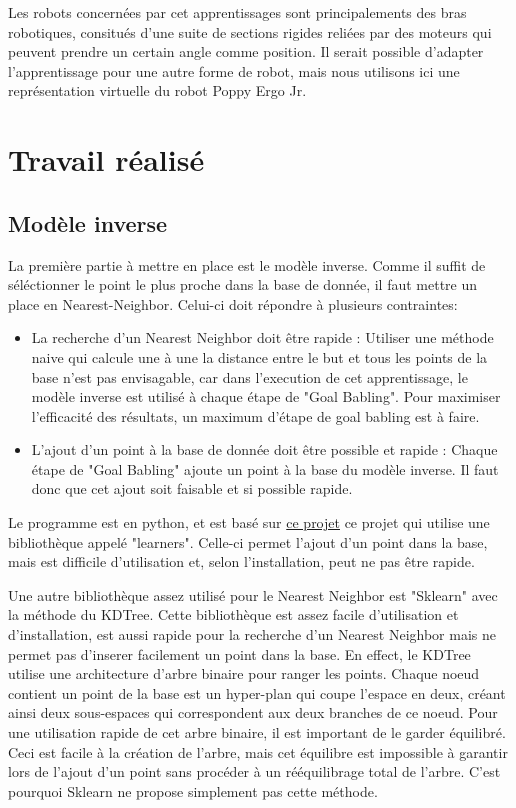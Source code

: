 \documentclass[11pt,french]{article}
\begin{document}
Les robots concernées par cet apprentissages sont principalements des bras robotiques, consitués d'une suite de sections rigides reliées par des moteurs qui peuvent prendre un certain angle comme position. Il serait possible d'adapter l'apprentissage pour une autre forme de robot, mais nous utilisons ici une représentation virtuelle du robot Poppy Ergo Jr.

\section{Travail réalisé}
\subsection{Modèle inverse}

La première partie à mettre en place est le modèle inverse. Comme il suffit de séléctionner le point le plus proche dans la base de donnée, il faut mettre un place en Nearest-Neighbor. Celui-ci doit répondre à plusieurs contraintes:
\begin{itemize}
    \item La recherche d'un Nearest Neighbor doit être rapide : Utiliser une méthode naive qui calcule une à une la distance entre le but et tous les points de la base n'est pas envisagable, car dans l'execution de cet apprentissage, le modèle inverse est utilisé à chaque étape de "Goal Babling". Pour maximiser l'efficacité des résultats, un maximum d'étape de goal babling est à faire.
    \item L'ajout d'un point à la base de donnée doit être possible et rapide : Chaque étape de "Goal Babling" ajoute un point à la base du modèle inverse. Il faut donc que cet ajout soit faisable et si possible rapide.
\end{itemize}

Le programme est en python, et est basé sur \href{http://www.fabien.benureau.com/recode/benureau2015_gb/benureau2015_gb.html}{ce projet} ce projet qui utilise une bibliothèque appelé "learners". Celle-ci permet l'ajout d'un point dans la base, mais est difficile d'utilisation et, selon l'installation, peut ne pas être rapide.

Une autre bibliothèque assez utilisé pour le Nearest Neighbor est "Sklearn" avec la méthode du KDTree. Cette bibliothèque est assez facile d'utilisation et d'installation, est aussi rapide pour la recherche d'un Nearest Neighbor mais ne permet pas d'inserer facilement un point dans la base. En effect, le KDTree utilise une architecture d'arbre binaire pour ranger les points. Chaque noeud contient un point de la base est un hyper-plan qui coupe l'espace en deux, créant ainsi deux sous-espaces qui correspondent aux deux branches de ce noeud. Pour une utilisation rapide de cet arbre binaire, il est important de le garder équilibré. Ceci est facile à la création de l'arbre, mais cet équilibre est impossible à garantir lors de l'ajout d'un point sans procéder à un rééquilibrage total de l'arbre. C'est pourquoi Sklearn ne propose simplement pas cette méthode.
\end{document}
